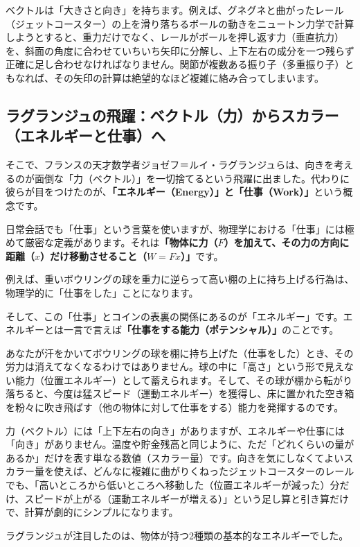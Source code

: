 ベクトルは「大きさと向き」を持ちます。例えば、グネグネと曲がったレール（ジェットコースター）の上を滑り落ちるボールの動きをニュートン力学で計算しようとすると、重力だけでなく、レールがボールを押し返す力（垂直抗力）を、斜面の角度に合わせていちいち矢印に分解し、上下左右の成分を一つ残らず正確に足し合わせなければなりません。関節が複数ある振り子（多重振り子）ともなれば、その矢印の計算は絶望的なほど複雑に絡み合ってしまいます。

\subsection{ラグランジュの飛躍：ベクトル（力）からスカラー（エネルギーと仕事）へ}

そこで、フランスの天才数学者ジョゼフ＝ルイ・ラグランジュらは、向きを考えるのが面倒な「力（ベクトル）」を一切捨てるという飛躍に出ました。代わりに彼らが目をつけたのが、\textbf{「エネルギー（Energy）」と「仕事（Work）」}という概念です。

日常会話でも「仕事」という言葉を使いますが、物理学における「仕事」には極めて厳密な定義があります。それは\textbf{「物体に力（\(F\)）を加えて、その力の方向に距離（\(x\)）だけ移動させること（\(W=Fx\)）」}です。

例えば、重いボウリングの球を重力に逆らって高い棚の上に持ち上げる行為は、物理学的に「仕事をした」ことになります。

そして、この「仕事」とコインの表裏の関係にあるのが「エネルギー」です。エネルギーとは一言で言えば\textbf{「仕事をする能力（ポテンシャル）」}のことです。

あなたが汗をかいてボウリングの球を棚に持ち上げた（仕事をした）とき、その労力は消えてなくなるわけではありません。球の中に「高さ」という形で見えない能力（位置エネルギー）として蓄えられます。そして、その球が棚から転がり落ちると、今度は猛スピード（運動エネルギー）を獲得し、床に置かれた空き箱を粉々に吹き飛ばす（他の物体に対して仕事をする）能力を発揮するのです。

力（ベクトル）には「上下左右の向き」がありますが、エネルギーや仕事には「向き」がありません。温度や貯金残高と同じように、ただ「どれくらいの量があるか」だけを表す単なる数値（スカラー量）です。向きを気にしなくてよいスカラー量を使えば、どんなに複雑に曲がりくねったジェットコースターのレールでも、「高いところから低いところへ移動した（位置エネルギーが減った）分だけ、スピードが上がる（運動エネルギーが増える）」という足し算と引き算だけで、計算が劇的にシンプルになります。

ラグランジュが注目したのは、物体が持つ2種類の基本的なエネルギーでした。


